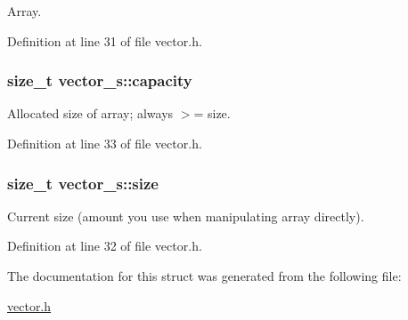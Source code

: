 \-Array. 



\-Definition at line 31 of file vector.\-h.

\hypertarget{structvector__s_ab06dc1a4c166fdc004c02e18eaad09d6}{
\subsubsection[{capacity}]{\setlength{\rightskip}{0pt plus 5cm}size\-\_\-t {\bf vector\-\_\-s\-::capacity}}}\label{structvector__s_ab06dc1a4c166fdc004c02e18eaad09d6}


\-Allocated size of array; always $>$= size. 



\-Definition at line 33 of file vector.\-h.

\hypertarget{structvector__s_a280d9c8b903f27cff3d8287b391a886f}{
\subsubsection[{size}]{\setlength{\rightskip}{0pt plus 5cm}size\-\_\-t {\bf vector\-\_\-s\-::size}}}\label{structvector__s_a280d9c8b903f27cff3d8287b391a886f}


\-Current size (amount you use when manipulating array directly). 



\-Definition at line 32 of file vector.\-h.



\-The documentation for this struct was generated from the following file\-:\begin{DoxyCompactItemize}
\item 
\hyperlink{vector_8h}{vector.\-h}\end{DoxyCompactItemize}

